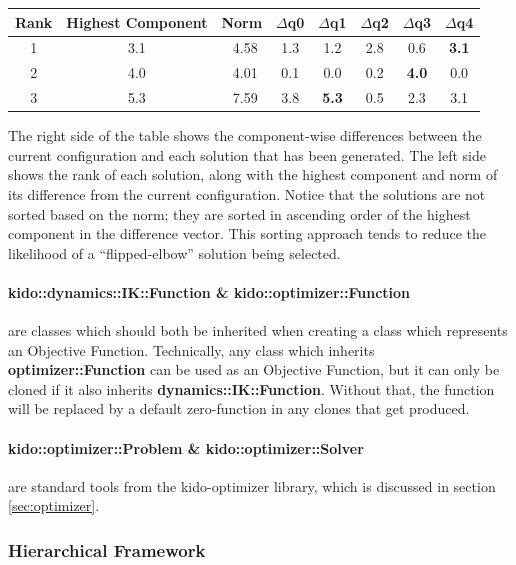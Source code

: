 \begin{tabular}{| c | c | c || c | c | c | c | c |}
  \hline
  Rank & \textbf{Highest Component} & Norm  & $\Delta$q0 & $\Delta$q1 & $\Delta$q2 & $\Delta$q3 & $\Delta$q4 \\ \hline
  1    & 3.1                        & ~4.58 & 1.3 & 1.2          & 2.8 & 0.6          & \textbf{3.1} \\ \hline
  2    & 4.0                        & ~4.01 & 0.1 & 0.0          & 0.2 & \textbf{4.0} & 0.0          \\ \hline
  3    & 5.3                        & ~7.59 & 3.8 & \textbf{5.3} & 0.5 & 2.3          & 3.1          \\ \hline
\end{tabular}

The right side of the table shows the component-wise differences between the current configuration and each solution that has been generated. The left side shows the rank of each solution, along with the highest component and norm of its difference from the current configuration. Notice that the solutions are not sorted based on the norm; they are sorted in ascending order of the highest component in the difference vector. This sorting approach tends to reduce the likelihood of a ``flipped-elbow'' solution being selected.

\paragraph{kido::dynamics::IK::Function \& kido::optimizer::Function} are classes which should both be inherited when creating a class which represents an Objective Function. Technically, any class which inherits \textbf{optimizer::Function} can be used as an Objective Function, but it can only be cloned if it also inherits \textbf{dynamics::IK::Function}. Without that, the function will be replaced by a default zero-function in any clones that get produced.

\paragraph{kido::optimizer::Problem \& kido::optimizer::Solver} are standard tools from the kido-optimizer library, which is discussed in section \ref{sec:optimizer}.

\subsubsection{Hierarchical Framework}
\label{sec:ik_hier_framework}

